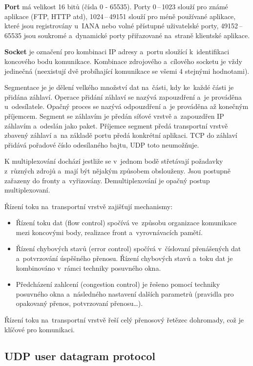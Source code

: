 \textbf{Port} má velikost 16 bitů (čísla 0 - 65535). Porty 0\,--\,1023 slouží pro známé aplikace (FTP, HTTP atd), 1024\,--\,49151 slouží pro méně používané aplikace, které jsou registrovány u~IANA nebo volné přístupné uživatelské porty, 49152\,--\,65535 jsou soukromé a~dynamické porty přiřazované na~straně klientské aplikace.

\textbf{Socket} je označení pro kombinaci IP adresy a~portu sloužící k~identifikaci koncového bodu komunikace. Kombinace zdrojového a~cílového socketu je vždy jedinečná (neexistují dvě probíhající komunikace se všemi 4 stejnými hodnotami).

Segmentace je je dělení velkého množství dat na~části, kdy ke~každé části je přidána záhlaví. Operace přidání záhlaví se nazývá zapouzdření a~je prováděna u~odesílatele. Opačný proces se nazývá odpouzdření a~je prováděna až konečným příjemcem. Segment se záhlavím je předán síťové vrstvě a~zapouzdřen IP záhlavím a~odeslán jako paket. Příjemce segment předá transportní vrstvě zbavený záhlaví a~na základě portu předá konkrétní aplikaci. TCP do záhlaví přidává pořadové číslo odesílaného bajtu, UDP toto neumožňuje.

K multiplexování dochází jestliže se v~jednom bodě střetávají požadavky z~různých zdrojů a~mají být nějakým způsobem obslouženy. Jsou postupně zařazeny do fronty a~vyřizovány. Demultiplexování je opačný postup multiplexovaní.

Řízení toku na~transportní vrstvě zajišťují mechanismy:
\begin{itemize}[noitemsep]
    \item Řízení toku dat (flow control) spočívá ve~způsobu organizace komunikace mezi koncovými body, realizace front a~vyrovnávacích pamětí.
    \item Řízení chybových stavů (error control) spočívá v~číslovaní  přenášených dat a~potvrzování úspěšného přenosu. Řízení chybových stavů a~toku dat je kombinováno v~rámci techniky posuvného okna.
    \item Předcházení zahlcení (congestion control) je řešeno pomocí techniky posuvného okna a~následného nastavení dalších parametrů (pravidla pro opakovaný přenos, potvrzovaní přenosu\dots).
\end{itemize}

Řízení toku  na~transportní vrstvě řeší celý přenosový řetězec dohromady, což je klíčové pro komunikaci.


\subsection{UDP user datagram protocol}

